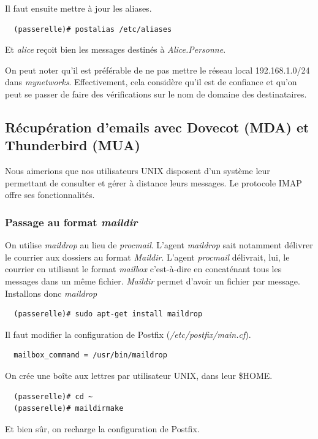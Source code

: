 \documentclass[a4paper]{article}
\begin{document}
Il faut ensuite mettre à jour les aliases.
\begin{verbatim}
  (passerelle)# postalias /etc/aliases
\end{verbatim}

Et \textit{alice} reçoit bien les messages destinés à
\textit{Alice.Personne}.

On peut noter qu'il est préférable de ne pas mettre le réseau local 192.168.1.0/24 dans
\textit{mynetworks}. Effectivement, cela considère qu'il est de confiance
et qu'on peut se passer de faire des vérifications sur le nom de domaine
des destinataires. 

\subsection{Récupération d'emails avec Dovecot (MDA) et Thunderbird (MUA)}

Nous aimerions que nos utilisateurs UNIX disposent d'un système 
leur permettant de consulter et gérer à distance leurs messages.
Le protocole IMAP offre ses fonctionnalités. 

\subsubsection{Passage au format \textit{maildir}}

On utilise \textit{maildrop} au lieu de \textit{procmail}.
L'agent \textit{maildrop} sait notamment délivrer le courrier aux dossiers au format
\textit{Maildir}. L'agent \textit{procmail} délivrait, lui, le courrier
en utilisant le format \textit{mailbox} c'est-à-dire en concaténant
tous les messages dans un même fichier. \textit{Maildir} permet
d'avoir un fichier par message.
Installons donc \textit{maildrop}
\begin{verbatim}
  (passerelle)# sudo apt-get install maildrop
\end{verbatim}

Il faut modifier la configuration de Postfix (\textit{/etc/postfix/main.cf}).
\begin{verbatim}
  mailbox_command = /usr/bin/maildrop
\end{verbatim}

On crée une boîte aux lettres par utilisateur UNIX, dans leur \$HOME.
\begin{verbatim}
  (passerelle)# cd ~
  (passerelle)# maildirmake
\end{verbatim}

Et bien sûr, on recharge la configuration de Postfix.
\end{document}
